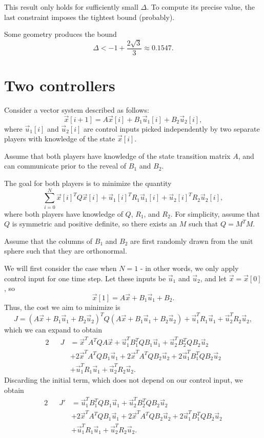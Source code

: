 \documentclass[letterpaper]{article}
\theoremstyle{remark}
\newcommand\note[1]{\marginpar{\textcolor{red}{#1}}}
\newcommand{\eqn}[1]{\begin{alignat*}{2}#1\end{alignat*}}
\begin{document}
This result only holds for sufficiently small $\Delta$. To compute its precise value, the last constraint imposes the tightest bound (probably). \note{Diagram}

Some geometry produces the bound
\[
    \Delta < -1 + \frac{2\sqrt{3}}{3} \approx 0.1547.
\]

\pagebreak
\section*{Two controllers}
Consider a vector system described as follows:
\[
    \vec{x}[i + 1] = A\vec{x}[i] + B_1\vec{u}_1[i] + B_2\vec{u}_2[i],
\]
where $\vec{u}_1[i]$ and $\vec{u}_2[i]$ are control inputs picked independently by two separate players with knowledge of the state $\vec{x}[i]$.

Assume that both players have knowledge of the state transition matrix $A$, and can communicate prior to the reveal of $B_1$ and $B_2$.

The goal for both players is to minimize the quantity
\[
    \sum_{i=0}^N \vec{x}[i]^TQ\vec{x}[i] + \vec{u}_1[i]^TR_1\vec{u}_1[i] + \vec{u}_2[i]^TR_2\vec{u}_2[i],
\]
where both players have knowledge of $Q$, $R_1$, and $R_2$. For simplicity, assume that $Q$ is symmetric and positive definite, so there exists an $M$ such that $Q = M^TM$.

Assume that the columns of $B_1$ and $B_2$ are first randomly drawn from the unit sphere such that they are orthonormal.

We will first consider the case when $N = 1$ - in other words, we only apply control input for one time step. Let these inputs be $\vec{u}_1$ and $\vec{u}_2$, and let $\vec{x} = \vec{x}[0]$, so
\[
    \vec{x}[1] = A\vec{x} + B_1\vec{u}_1 + B_2.
\]
Thus, the cost we aim to minimize is
\[
    J = (A\vec{x} + B_1\vec{u}_1 + B_2\vec{u}_2)^TQ(A\vec{x} + B_1\vec{u}_1 + B_2\vec{u}_2) + \vec{u}_1^TR_1\vec{u}_1 + \vec{u}_2^TR_2\vec{u}_2,
\]
which we can expand to obtain
\eqn{
    && J &= \vec{x}^TA^TQA\vec{x} + \vec{u}_1^TB_1^TQB_1\vec{u}_1 + \vec{u}_2^TB_2^TQB_2\vec{u}_2 \\ 
    &&&+ 2\vec{x}^TA^TQB_1\vec{u}_1 + 2\vec{x}^TA^TQB_2\vec{u}_2 + 2\vec{u}_1^TB_1^TQB_2\vec{u}_2 \\
    &&&+ \vec{u}_1^TR_1\vec{u}_1 + \vec{u}_2^TR_2\vec{u}_2.
}
Discarding the initial term, which does not depend on our control input, we obtain
\eqn{
    && J' &= \vec{u}_1^TB_1^TQB_1\vec{u}_1 + \vec{u}_2^TB_2^TQB_2\vec{u}_2 \\ 
    &&&+ 2\vec{x}^TA^TQB_1\vec{u}_1 + 2\vec{x}^TA^TQB_2\vec{u}_2 + 2\vec{u}_1^TB_1^TQB_2\vec{u}_2 \\
    &&&+ \vec{u}_1^TR_1\vec{u}_1 + \vec{u}_2^TR_2\vec{u}_2.
}
\end{document}
